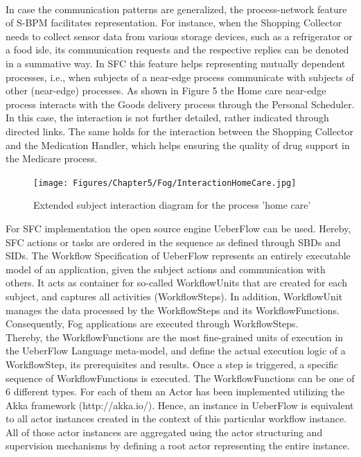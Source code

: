 \\
In case the communication patterns are generalized, the process-network feature of S-BPM facilitates representation. For instance, when the Shopping Collector needs to collect sensor data from various storage devices, such as a refrigerator or a food isle, its communication requests and the respective replies can be denoted in a summative way. In SFC this feature helps representing mutually dependent processes, i.e., when subjects of a near-edge process communicate with subjects of other (near-edge) processes. As shown in Figure 5 the Home care near-edge process interacts with the Goods delivery process through the Personal Scheduler. In this case, the interaction is not further detailed, rather indicated through directed links. The same holds for the interaction between the Shopping Collector and the Medication Handler, which helps ensuring the quality of drug support in the Medicare process.

\begin{figure}[htbp]
	\centering
	\texttt{[image: Figures/Chapter5/Fog/InteractionHomeCare.jpg]}
	\caption[Extended subject interaction diagram for the process ‘home care’]{Extended subject interaction diagram for the process 'home care'}
	\label{fig:InteractionHomeCare}
\end{figure}


For SFC implementation the open source engine UeberFlow \cite{DynamicPerspective} can be used. Hereby, SFC actions or tasks are ordered in the sequence as defined through SBDs and SIDs. The Workflow Specification of UeberFlow represents an entirely executable model of an application, given the subject actions and communication with others. It acts as container for so-called WorkflowUnits that are created for each subject, and captures all activities (WorkflowSteps). In addition, WorkflowUnit manages the data processed by the WorkflowSteps and its WorkflowFunctions. Consequently, Fog applications are executed through WorkflowSteps.
\\
Thereby, the WorkflowFunctions are the most fine-grained units of execution in the UeberFlow Language meta-model, and define the actual execution logic of a WorkflowStep, its prerequisites and results. Once a step is triggered, a specific sequence of WorkflowFunctions is executed. The WorkflowFunctions can be one of 6 different types. For each of them an Actor has been implemented utilizing the Akka framework (http://akka.io/). Hence, an instance in UeberFlow is equivalent to all actor instances created in the context of this particular workflow instance. All of those actor instances are aggregated using the actor structuring and supervision mechanisms by defining a root actor representing the entire instance.


